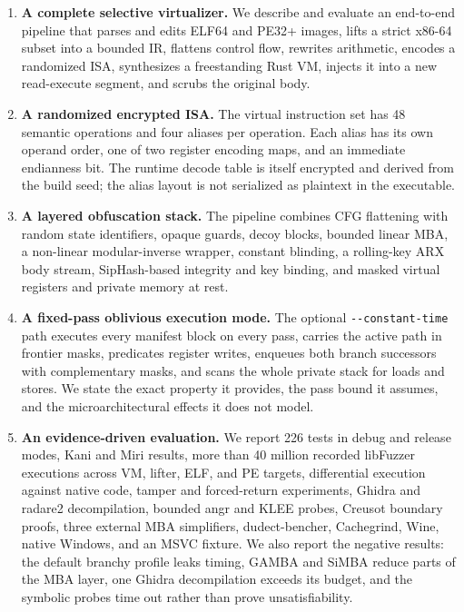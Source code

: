 \begin{enumerate}
  \item \textbf{A complete selective virtualizer.} We describe and evaluate an
        end-to-end pipeline that parses and edits ELF64 and PE32+ images, lifts a
        strict x86-64 subset into a bounded IR, flattens control flow, rewrites
        arithmetic, encodes a randomized ISA, synthesizes a freestanding
         Rust VM, injects it into a new read-execute segment, and
        scrubs the original body.

  \item \textbf{A randomized encrypted ISA.} The virtual instruction set has 48
        semantic operations and four aliases per operation. Each alias has its
        own operand order, one of two register encoding maps, and an immediate
        endianness bit. The runtime decode table is itself encrypted and derived
        from the build seed; the alias layout is not serialized as plaintext in
        the executable.

  \item \textbf{A layered obfuscation stack.} The pipeline combines CFG
        flattening with random state identifiers, opaque guards, decoy blocks,
        bounded linear MBA, a non-linear modular-inverse wrapper, constant
        blinding, a rolling-key ARX body stream, SipHash-based integrity and key
        binding, and masked virtual registers and private memory at rest.

  \item \textbf{A fixed-pass oblivious execution mode.} The optional
        \verb|--constant-time| path executes every manifest block on every pass,
        carries the active path in frontier masks, predicates register writes,
        enqueues both branch successors with complementary masks, and scans the
        whole private stack for loads and stores. We state the exact property it
        provides, the pass bound it assumes, and the microarchitectural effects it
        does not model.

  \item \textbf{An evidence-driven evaluation.} We report 226 tests in debug and
        release modes, Kani and Miri results, more than 40 million recorded
        libFuzzer executions across VM, lifter, ELF, and PE targets, differential
        execution against native code, tamper and forced-return experiments,
        Ghidra and radare2 decompilation, bounded angr and KLEE probes, Creusot
        boundary proofs, three external MBA simplifiers, dudect-bencher,
        Cachegrind, Wine, native Windows, and an MSVC  fixture.
        We also report the negative results: the default branchy profile leaks
        timing, GAMBA and SiMBA reduce parts of the MBA layer, one Ghidra
        decompilation exceeds its budget, and the symbolic probes time out rather
        than prove unsatisfiability.


\end{enumerate}
